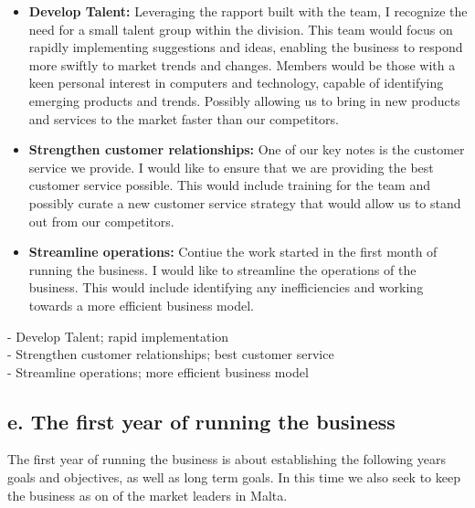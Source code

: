 \documentclass{article}
\begin{document}
\begin{itemize}
    \item \textbf{Develop Talent:} Leveraging the rapport built with the team, I recognize the need for a small talent group within the division. This team would focus on rapidly implementing suggestions and ideas, enabling the business to respond more swiftly to market trends and changes. Members would be those with a keen personal interest in computers and technology, capable of identifying emerging products and trends. Possibly allowing us to bring in new products and services to the market faster than our competitors. \\
    \item \textbf{Strengthen customer relationships:} One of our key notes is the customer service we provide. I would like to ensure that we are providing the best customer service possible. This would include training for the team and possibly curate a new customer service strategy that would allow us to stand out from our competitors. \\
    \item \textbf{Streamline operations:} Contiue the work started in the first month of running the business. I would like to streamline the operations of the business. This would include identifying any inefficiencies and working towards a more efficient business model. \\
\end{itemize}
- Develop Talent; rapid implementation \\
- Strengthen customer relationships; best customer service \\
- Streamline operations; more efficient business model \\

\subsection{e. The first year of running the business}
The first year of running the business is about establishing the following years goals and objectives, as well as long term goals. In this time we also seek to keep the business as on of the market leaders in Malta. \\
\end{document}
